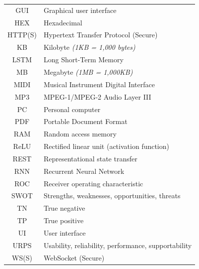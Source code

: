 \documentclass[a4paper, 11pt, twoside]{report}
\theoremstyle{definition}
\begin{document}
\begin{longtable}{cl}
    GUI     & Graphical user interface                                        \\
    HEX     & Hexadecimal                                                     \\
    HTTP(S) & Hypertext Transfer Protocol (Secure)                            \\
    KB      & Kilobyte \textit{(1KB = 1,000 bytes)}                           \\
    LSTM    & Long Short-Term Memory                                          \\
    MB      & Megabyte \textit{(1MB = 1,000KB)}                               \\
    MIDI    & Musical Instrument Digital Interface                            \\
    MP3     & MPEG-1/MPEG-2 Audio Layer III                                   \\
    PC      & Personal computer                                               \\
    PDF     & Portable Document Format                                        \\
    RAM     & Random access memory                                            \\
    ReLU    & Rectified linear unit (activation function)                     \\
    REST    & Representational state transfer                                 \\
    RNN     & Recurrent Neural Network                                        \\
    ROC     & Receiver operating characteristic                               \\
    SWOT    & Strengths, weaknesses, opportunities, threats                   \\
    TN      & True negative                                                   \\
    TP      & True positive                                                   \\
    UI      & User interface                                                  \\
    URPS    & Usability, reliability, performance, supportability             \\
    WS(S)   & WebSocket (Secure)                                              \\
\end{longtable}
\end{document}
